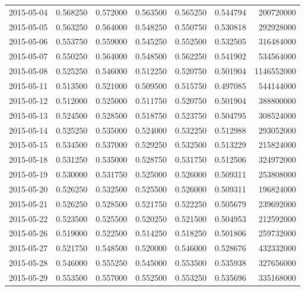 \begin{tabular}{lrrrrrr}
2015-05-04 &    0.568250 &    0.572000 &    0.563500 &    0.565250 &    0.544794 &   200720000 \\
2015-05-05 &    0.563250 &    0.564000 &    0.548250 &    0.550750 &    0.530818 &   292928000 \\
2015-05-06 &    0.553750 &    0.559000 &    0.545250 &    0.552500 &    0.532505 &   316484000 \\
2015-05-07 &    0.550250 &    0.564000 &    0.548500 &    0.562250 &    0.541902 &   534564000 \\
2015-05-08 &    0.525250 &    0.546000 &    0.512250 &    0.520750 &    0.501904 &  1146552000 \\
2015-05-11 &    0.513500 &    0.521000 &    0.509500 &    0.515750 &    0.497085 &   544144000 \\
2015-05-12 &    0.512000 &    0.525000 &    0.511750 &    0.520750 &    0.501904 &   388800000 \\
2015-05-13 &    0.524500 &    0.528500 &    0.518750 &    0.523750 &    0.504795 &   308524000 \\
2015-05-14 &    0.525250 &    0.535000 &    0.524000 &    0.532250 &    0.512988 &   293052000 \\
2015-05-15 &    0.534500 &    0.537000 &    0.529250 &    0.532500 &    0.513229 &   215824000 \\
2015-05-18 &    0.531250 &    0.535000 &    0.528750 &    0.531750 &    0.512506 &   324972000 \\
2015-05-19 &    0.530000 &    0.531750 &    0.525000 &    0.526000 &    0.509311 &   253808000 \\
2015-05-20 &    0.526250 &    0.532500 &    0.525500 &    0.526000 &    0.509311 &   196824000 \\
2015-05-21 &    0.526250 &    0.528500 &    0.521750 &    0.522250 &    0.505679 &   239692000 \\
2015-05-22 &    0.523500 &    0.525500 &    0.520250 &    0.521500 &    0.504953 &   212592000 \\
2015-05-26 &    0.519000 &    0.522500 &    0.514250 &    0.518250 &    0.501806 &   259732000 \\
2015-05-27 &    0.521750 &    0.548500 &    0.520000 &    0.546000 &    0.528676 &   432332000 \\
2015-05-28 &    0.546000 &    0.555250 &    0.545000 &    0.553500 &    0.535938 &   327656000 \\
2015-05-29 &    0.553500 &    0.557000 &    0.552500 &    0.553250 &    0.535696 &   335168000 \\

\end{tabular}
